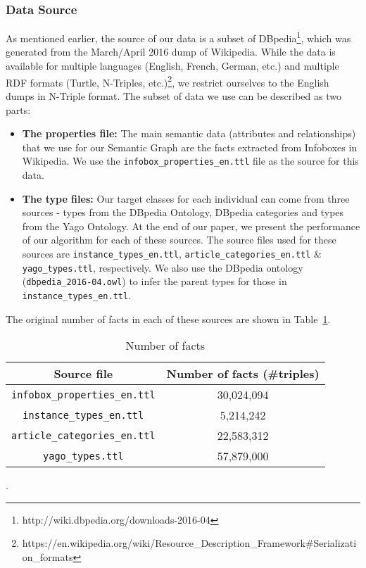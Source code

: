 \documentclass[runningheads,a4paper]{llncs}
\begin{document}
\subsubsection{Data Source}
As mentioned earlier, the source of our data is a subset of DBpedia\footnote{http://wiki.dbpedia.org/downloads-2016-04}, which was generated from the March/April 2016 dump of Wikipedia. While the data is available for multiple languages (English, French, German, etc.) and multiple RDF formats (Turtle, N-Triples, etc.)\footnote{https://en.wikipedia.org/wiki/Resource\_Description\_Framework\#Serialization\_formats}, we restrict ourselves to the English dumps in N-Triple format. The subset of data we use can be described as two parts:

\begin{itemize}
  \item \textbf{The properties file:} The main semantic data  (attributes and relationships) that we use for our Semantic Graph are the facts extracted from Infoboxes in Wikipedia. We use the \texttt{infobox\_properties\_en.ttl} file as the source for this data. 
  \item \textbf{The type files:} Our target classes for each individual can come from three sources - types from the DBpedia Ontology, DBpedia categories and types from the Yago Ontology. At the end of our paper, we present the performance of our algorithm for each of these sources. The source files used for these sources are \texttt{instance\_types\_en.ttl}, \texttt{article\_categories\_en.ttl} \& \texttt{yago\_types.ttl}, respectively. We also use the DBpedia ontology (\texttt{dbpedia\_2016-04.owl}) to infer the parent types for those in \texttt{instance\_types\_en.ttl}.
\end{itemize}

The original number of facts in each of these sources are shown in Table~\ref{tab:sources}.

\begin{table}
\caption{Number of facts}
\begin{center}
  \begin{tabular}{ | c | c | }
    \hline
    \textbf{Source file} & \textbf{Number of facts (\#triples}) \\
    \hline
    \texttt{infobox\_properties\_en.ttl} & 30,024,094 \\
    \hline
    \texttt{instance\_types\_en.ttl} & 5,214,242 \\
    \hline
    \texttt{article\_categories\_en.ttl} & 22,583,312 \\
    \hline
    \texttt{yago\_types.ttl} & 57,879,000 \\
    \hline
  \end{tabular}
\end{center}
\label{tab:sources}.
\end{table}
\end{document}
